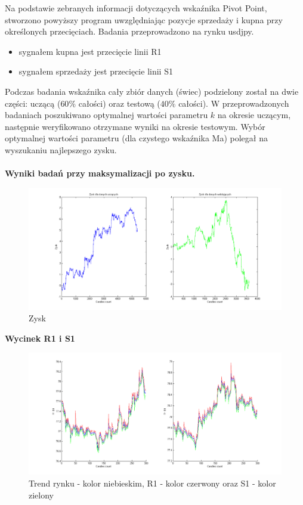 \documentclass[12pt,a4paper]{article}
\begin{document}
Na podstawie zebranych informacji dotyczących wskaźnika Pivot Point, stworzono powyższy program uwzględniając pozycje sprzedaży i kupna przy określonych przecięciach. Badania przeprowadzono na rynku usdjpy.
\begin{itemize}
\item sygnałem kupna jest przecięcie linii R1
\item sygnałem sprzedaży jest przecięcie linii S1
\newline
\end{itemize}
Podczas badania wskaźnika cały zbiór danych (świec) podzielony został na dwie części: uczącą ($60\%$ całości) oraz testową ($40\%$ całości). W przeprowadzonych badaniach poszukiwano optymalnej wartości parametru $k$ na okresie uczącym, następnie weryfikowano otrzymane wyniki na okresie testowym. Wybór optymalnej wartości parametru (dla czystego wskaźnika Ma) polegał na wyszukaniu najlepszego zysku. \\

\noindent \textbf{\\Wyniki badań przy maksymalizacji po zysku.}\\
\begin{figure}[h!]
\centering
\includegraphics[scale=0.4]{pp_zysk_us.png}
\caption{Zysk}

\end{figure}
\FloatBarrier

\newpage
\noindent \textbf{Wycinek R1 i S1}\\
\begin{figure}[h!]
\centering
\includegraphics[scale=0.4]{pp_rs_us.png}
\caption{Trend rynku - kolor niebieskim, R1 - kolor czerwony oraz S1 - kolor zielony }
\end{figure}
\FloatBarrier
\end{document}
